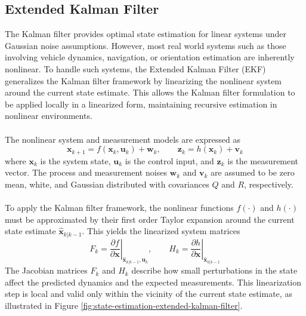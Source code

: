\subsection{Extended Kalman Filter}
The Kalman filter provides optimal state estimation for linear systems under Gaussian noise assumptions. However, most real world systems such as those involving vehicle dynamics, navigation, or orientation estimation are inherently nonlinear. To handle such systems, the Extended Kalman Filter (EKF) generalizes the Kalman filter framework by linearizing the nonlinear system around the current state estimate. This allows the Kalman filter formulation to be applied locally in a linearized form, maintaining recursive estimation in nonlinear environments.  
\\ \\
The nonlinear system and measurement models are expressed as
$$
    \mathbf{x}_{k+1} = f(\mathbf{x}_k, \mathbf{u}_k) + \mathbf{w}_k, \qquad
    \mathbf{z}_k = h(\mathbf{x}_k) + \mathbf{v}_k
$$
where $\mathbf{x}_k$ is the system state, $\mathbf{u}_k$ is the control input, and $\mathbf{z}_k$ is the measurement vector. The process and measurement noises $\mathbf{w}_k$ and $\mathbf{v}_k$ are assumed to be zero mean, white, and Gaussian distributed with covariances $Q$ and $R$, respectively.  
\\ \\
To apply the Kalman filter framework, the nonlinear functions $f(\cdot)$ and $h(\cdot)$ must be approximated by their first order Taylor expansion around the current state estimate $\hat{\mathbf{x}}_{k|k-1}$. This yields the linearized system matrices
$$
    F_k = \left.\frac{\partial f}{\partial \mathbf{x}}\right|_{\hat{\mathbf{x}}_{k|k-1}, \mathbf{u}_k}, \qquad
    H_k = \left.\frac{\partial h}{\partial \mathbf{x}}\right|_{\hat{\mathbf{x}}_{k|k-1}}
$$
The Jacobian matrices $F_k$ and $H_k$ describe how small perturbations in the state affect the predicted dynamics and the expected measurements. This linearization step is local and valid only within the vicinity of the current state estimate, as illustrated in Figure \ref{fig:state-estimation-extended-kalman-filter}.  
\\ \\
